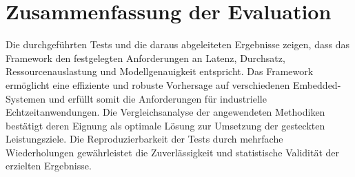 \section{Zusammenfassung der Evaluation}

Die durchgeführten Tests und die daraus abgeleiteten Ergebnisse zeigen, dass das Framework den festgelegten Anforderungen an Latenz, 
Durchsatz, Ressourcenauslastung und Modellgenauigkeit entspricht. Das Framework ermöglicht eine effiziente und robuste 
Vorhersage auf verschiedenen Embedded-Systemen und erfüllt somit die Anforderungen für industrielle Echtzeitanwendungen. 
Die Vergleichsanalyse der angewendeten Methodiken bestätigt deren Eignung als optimale Lösung zur Umsetzung 
der gesteckten Leistungsziele. Die Reproduzierbarkeit der Tests durch mehrfache Wiederholungen gewährleistet die 
Zuverlässigkeit und statistische Validität der erzielten Ergebnisse.
